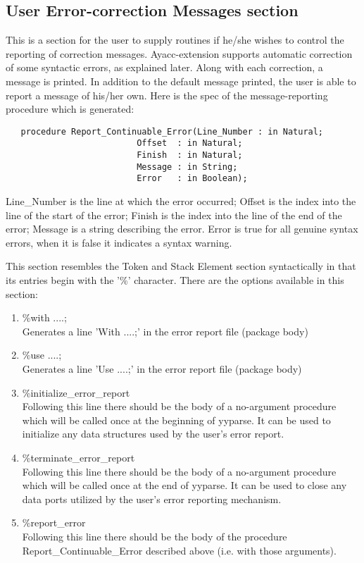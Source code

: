 \subsection{User Error-correction Messages section}
This is a section for the user to supply routines if he/she wishes to
control the reporting of correction messages. Ayacc-extension supports
automatic correction of some syntactic errors, as explained later.
Along with each correction, a message is printed. In addition to the
default message printed, the user is able to report a message of
his/her own. Here is the spec of the message-reporting procedure which
is generated:
\begin{verbatim}
   procedure Report_Continuable_Error(Line_Number : in Natural;
                          Offset  : in Natural;
                          Finish  : in Natural;
                          Message : in String;
                          Error   : in Boolean);
\end{verbatim}

Line\_Number is the line at which the error occurred; Offset is the index
into the line of the start of the error; Finish is the index into the 
line of the end of the error; Message is a string describing the error.
Error is true for all genuine syntax errors, when it is false it indicates 
a syntax warning.

This section resembles the Token and Stack Element section syntactically
in that its entries begin with the '\%' character. There are the options
available in this section:
\begin{enumerate}
\item \%with ....;\\
Generates a line 'With ....;' in the error report file (package body)\\
\item \%use ....;\\
Generates a line 'Use ....;' in the error report file (package body)\\
\item \%initialize\_error\_report\\
Following this line there should be the body of a no-argument procedure
which will be called once at the beginning of yyparse. It can be used to
initialize any data structures used by the user's error report.\\
\item \%terminate\_error\_report\\
Following this line there should be the body of a no-argument procedure
which will be called once at the end of yyparse. It can be used to close
any data ports utilized by the user's error reporting mechanism.\\
\item \%report\_error\\
Following this line there should be the body of the procedure 
Report\_Continuable\_Error described above (i.e. with those arguments).
\end{enumerate}

